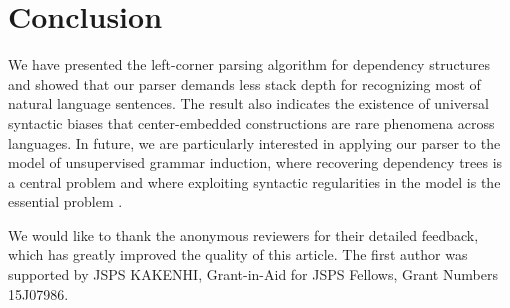 \documentclass[english]{jnlp_1.4}
\begin{document}
\section{Conclusion}
\label{sec:conclusion}

We have presented the left-corner parsing algorithm for dependency structures and showed that our parser demands less stack depth for recognizing most of natural language sentences.
The result also indicates the existence of universal syntactic biases that center-embedded constructions are rare phenomena across languages.
In future, we are particularly interested in applying our parser to the model of unsupervised grammar induction, where recovering dependency trees is a central problem \cite{klein-manning:2004:ACL} and where exploiting syntactic regularities in the model is the essential problem \cite{smith-eisner-2006-acl-sa,marevcek-vzabokrtsky:2012:EMNLP-CoNLL,DBLP:journals/tacl/BiskH13}.


\acknowledgment

We would like to thank the anonymous reviewers for their detailed feedback, which has greatly improved the quality of this article.
The first author was supported by JSPS KAKENHI, Grant-in-Aid for JSPS Fellows, Grant Numbers 15J07986.
\end{document}

